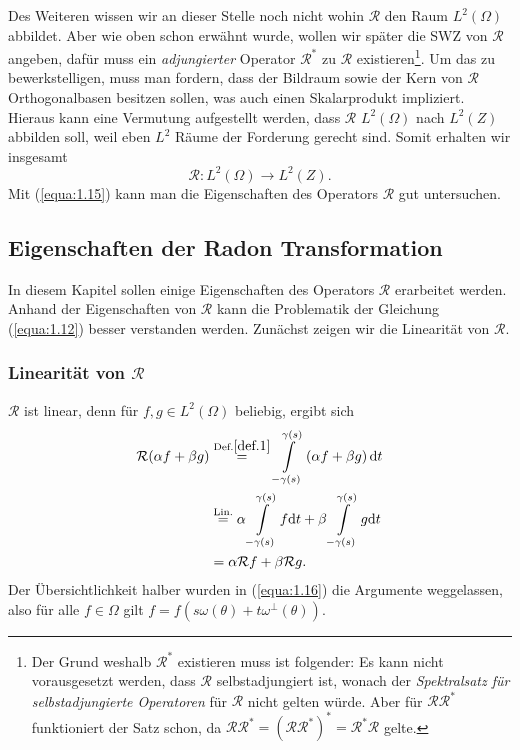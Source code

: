 Des Weiteren  wissen wir an dieser Stelle noch nicht wohin $\mathcal{R}$ den Raum $L^2(\Omega)$ abbildet. Aber wie oben schon erwähnt wurde, wollen wir später die SWZ von $\mathcal{R}$ angeben, dafür muss ein \textit{adjungierter} Operator $\mathcal{R^*}$ zu $\mathcal{R}$ existieren\footnote{\label{foot:5} Der Grund weshalb $\mathcal{R^*}$ existieren muss ist folgender: Es kann nicht vorausgesetzt werden, dass $\mathcal{R}$ selbstadjungiert ist, wonach der \textit{Spektralsatz für selbstadjungierte Operatoren} für $\mathcal{R}$ nicht gelten würde. Aber für $\mathcal{R}\mathcal{R^*}$ funktioniert der Satz schon, da $\mathcal{R}\mathcal{R^*} = (\mathcal{R}\mathcal{R^*})^* = \mathcal{R^*}\mathcal{R}$ gelte.}. Um das zu bewerkstelligen, muss man fordern, dass der Bildraum sowie der Kern von $\mathcal{R}$ Orthogonalbasen besitzen sollen, was auch einen Skalarprodukt impliziert. Hieraus kann eine Vermutung aufgestellt werden, dass $\mathcal{R}$ $L^2(\Omega)$ nach $L^2(Z)$ abbilden soll, weil eben $L^2$ Räume der Forderung gerecht sind. Somit erhalten wir insgesamt
\begin{equation}
	\mathcal{R} : L^2(\Omega) \rightarrow L^2(Z).
	\label{equa:1.15}
\end{equation}
Mit (\ref{equa:1.15}) kann man die Eigenschaften des Operators $\mathcal{R}$ gut untersuchen.

\subsection{Eigenschaften der Radon Transformation}
\label{cha:1.2.2}

In diesem Kapitel sollen einige Eigenschaften des Operators $\mathcal{R}$ erarbeitet werden. Anhand der Eigenschaften von $\mathcal{R}$ kann die Problematik der Gleichung (\ref{equa:1.12}) besser verstanden werden. Zunächst zeigen wir die Linearität von $\mathcal{R}$. 
\subsubsection{Linearität von $\mathcal{R}$}
$\mathcal{R}$ ist linear, denn für $f, g \in L^2(\Omega)$ beliebig,  ergibt sich 
\begin{equation}
	\begin{split}
		\mathcal{R}( \alpha f + \beta g) & \stackrel{\mbox{\scriptsize Def.}\ref{def.1}}{=}  \int\limits_{-\gamma(s)}^{\gamma(s)} \left( \alpha f + \beta g\right ) \mbox{d}t\\
		& \stackrel{\mbox{\scriptsize Lin.}}{=} \alpha \int\limits_{-\gamma(s)}^{\gamma(s)} f\mbox{d}t  +  \beta \int\limits_{-\gamma(s)}^{\gamma(s)} g \mbox{d}t\\
		& = \alpha \mathcal{R} f +  \beta \mathcal{R} g .
	\end{split}
	\label{equa:1.16}
\end{equation}
Der Übersichtlichkeit halber wurden in (\ref{equa:1.16}) die Argumente weggelassen, also für alle $f \in \Omega$ gilt $f = f(s\omega(\theta) + t\omega^{\perp}(\theta))$.

